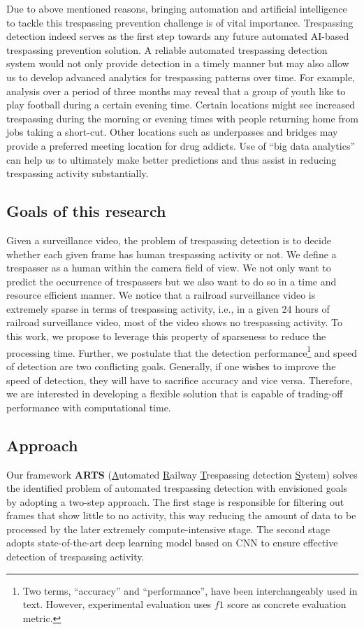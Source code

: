 Due to above mentioned reasons, bringing automation and artificial intelligence to tackle this trespassing prevention challenge is of vital importance. Trespassing detection indeed serves as the first step towards any future automated AI-based trespassing prevention solution. A reliable automated trespassing detection system would not only provide detection in a timely manner but may also allow us to develop advanced analytics for trespassing patterns over time. For example, analysis over a period of three months may reveal that a group of youth like to play football during a certain evening time. Certain locations might see increased trespassing during the morning or evening times with people returning home from jobs taking a short-cut. Other locations such as underpasses and bridges may provide a preferred meeting location for drug addicts. Use of ``big data analytics'' can help us to ultimately make better predictions and thus assist in reducing trespassing activity substantially.
\subsection{Goals of this research}
\label{sec:goal}
Given a surveillance video, the problem of trespassing detection is to decide whether each given frame has human trespassing activity or not. We define a trespasser as a human within the camera field of view. We not only want to predict the occurrence of trespassers but we also want to do so in a time and resource efficient manner. We notice that a railroad surveillance video is extremely sparse in terms of trespassing activity, i.e., in a given 24 hours of railroad surveillance video, most of the video shows no trespassing activity. To this work, we propose to leverage this property of sparseness to reduce the processing time. 
Further, we postulate that the detection performance\footnote{Two terms, ``accuracy'' and ``performance'', have been interchangeably used in text. However, experimental evaluation uses $f1$ score as concrete evaluation metric.} and speed of detection are two conflicting goals. Generally, if one wishes to improve the speed of detection, they will have to sacrifice accuracy and vice versa. Therefore, we are interested in developing a  flexible solution that is capable of trading-off performance with computational time.
\subsection{Approach}
Our framework \textbf{ARTS} (\underline{A}utomated \underline{R}ailway \underline{T}respassing detection \underline{S}ystem) solves the identified problem of automated trespassing detection with envisioned goals by adopting a two-step approach. The first stage is responsible for filtering out frames that show little to no activity, this way reducing the amount of data to be processed by the later extremely compute-intensive stage. The second stage adopts state-of-the-art deep learning model based on CNN to ensure effective detection of trespassing activity.
